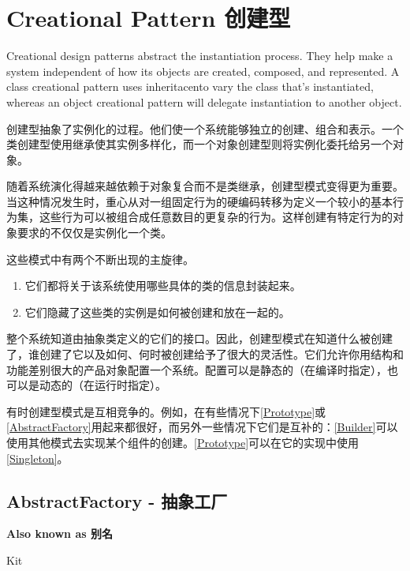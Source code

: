 \chapter{Creational Pattern 创建型}

Creational design patterns abstract the instantiation process. They help make a system independent of how its objects are created, composed, and represented. A class creational pattern uses inheritacento vary the class that's instantiated, whereas an object creational pattern will delegate instantiation to another object.

创建型抽象了实例化的过程。他们使一个系统能够独立的创建、组合和表示。一个类创建型使用继承使其实例多样化，而一个对象创建型则将实例化委托给另一个对象。

随着系统演化得越来越依赖于对象复合而不是类继承，创建型模式变得更为重要。当这种情况发生时，重心从对一组固定行为的硬编码转移为定义一个较小的基本行为集，这些行为可以被组合成任意数目的更复杂的行为。这样创建有特定行为的对象要求的不仅仅是实例化一个类。

这些模式中有两个不断出现的主旋律。

\begin{enumerate}

\item 它们都将关于该系统使用哪些具体的类的信息封装起来。

\item 它们隐藏了这些类的实例是如何被创建和放在一起的。

\end{enumerate}

整个系统知道由抽象类定义的它们的接口。因此，创建型模式在知道什么被创建了，谁创建了它以及如何、何时被创建给予了很大的灵活性。它们允许你用结构和功能差别很大的产品对象配置一个系统。配置可以是静态的（在编译时指定），也可以是动态的（在运行时指定）。

有时创建型模式是互相竞争的。例如，在有些情况下\ref{Prototype}或\ref{AbstractFactory}用起来都很好，而另外一些情况下它们是互补的：\ref{Builder}可以使用其他模式去实现某个组件的创建。\ref{Prototype}可以在它的实现中使用\ref{Singleton}。

\section{AbstractFactory - 抽象工厂}

\textbf{Also known as 别名}

Kit

